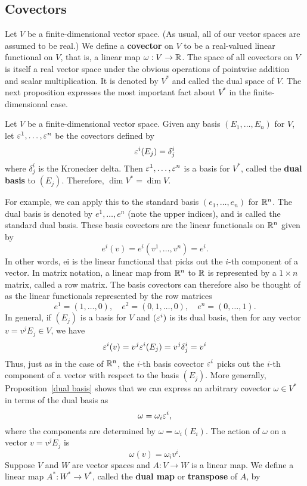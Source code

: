 \subsection{Covectors}
Let $V$ be a finite-dimensional vector space. (As usual, all of our vector spaces are assumed to be real.) We define a \textbf{covector} on $V$ to be a real-valued linear functional on $V$, that is, a linear map $\omega:V\to\mathbb{R}$. The space of all covectors on $V$ is itself a real vector space under the obvious operations of pointwise addition and scalar multiplication. It is denoted by $V^*$ and called the dual space of $V$. The next proposition expresses the most important fact about $V^*$ in the finite-dimensional case.
\begin{proposition}\label{dual basis}
Let $V$ be a finite-dimensional vector space. Given any basis $(E_1,\dots,E_n)$ for $V$, let $\varepsilon^1,\dots,\varepsilon^n$ be the covectors defined by
\[\varepsilon^i(E_j)=\delta^i_j\]
where $\delta^i_j$ is the Kronecker delta. Then $\varepsilon^1,\dots,\varepsilon^n$ is a basis for $V^*$, called the \textbf{dual basis} to $(E_j)$. Therefore, $\dim V^*=\dim V$.
\end{proposition}
For example, we can apply this to the standard basis $(e_1,\dots,e_n)$ for $\mathbb{R}^n$. The dual basis is denoted by $e^1,\dots,e^n$ (note the upper indices), and is called the standard dual basis. These basis covectors are the linear functionals on $\mathbb{R}^n$ given by
\[e^i(v)=e^i(v^1,\dots,v^n)=e^i.\]
In other words, ei is the linear functional that picks out the $i$-th component of a vector. In matrix notation, a linear map from $\mathbb{R}^n$ to $\mathbb{R}$ is represented by a $1\times n$ matrix, called a row matrix. The basis covectors can therefore also be thought of as the linear functionals represented by the row matrices
\[e^1=(1,\dots,0),\quad e^2=(0,1,\dots,0),\quad e^n=(0,\dots,1).\]
In general, if $(E_j)$ is a basis for $V$ and $(\varepsilon^i)$ is its dual basis, then for any vector $v=v^jE_j\in V$, we have
\[\varepsilon^i(v)=v^j\varepsilon^i(E_j)=v^j\delta^i_j=v^i\]
Thus, just as in the case of $\mathbb{R}^n$, the $i$-th basis covector $\varepsilon^i$ picks out the $i$-th component of a vector with respect to the basis $(E_j)$. More generally, Proposition~\ref{dual basis} shows that we can express an arbitrary covector $\omega\in V^*$ in terms of the dual basis as
\[\omega=\omega_i\varepsilon^i,\]
where the components are determined by $\omega=\omega_i(E_i)$. The action of $\omega$ on a vector $v=v^jE_j$ is
\[\omega(v)=\omega_iv^i.\]
Suppose $V$ and $W$ are vector spaces and $A:V\to W$ is a linear map. We define a linear map $A^*:W^*\to V^*$, called the \textbf{dual map} or \textbf{transpose} of $A$, by
